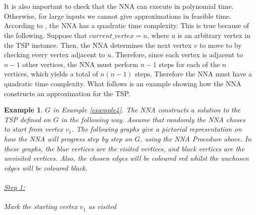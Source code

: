 \documentclass{article}
\newtheorem{example}[definition]{Example}
\begin{document}
\\\\It is also important to check that the NNA can execute in polynomial time. Otherwise, for large inputs we cannot give approximations in feasible time. According to \cite{article}, the NNA has a quadratic time complexity. This is true because of the following. Suppose that $current\_vertex = u$, where $u$ is an arbitrary vertex in the TSP instance. Then, the NNA determines the next vertex $v$ to move to by checking every vertex adjacent to $u$. Therefore, since each vertex is adjacent to $n-1$ other vertices, the NNA must perform $n-1$ steps for each of the $n$ vertices, which yields a total of $n(n-1)$ steps. Therefore the NNA must have a quadratic time complexity. What follows is an example showing how the NNA constructs an approximation for the TSP.
\begin{example}
\label{example_nna_explanation}
 $G$ in Example \ref{example4}. The NNA constructs a solution to the TSP defined on $G$ in the following way. Assume that randomly the NNA choses to start from vertex $v_1$. The following graphs give a pictorial representation on how the NNA will progress step by step on $G$, using the NNA Procedure above. In these graphs, the blue vertices are the visited vertices, and black vertices are the unvisited vertices. Also, the chosen edges will be coloured red whilst the unchosen edges will be coloured black.\\\\
\underline{Step 1:}\\\\
Mark the starting vertex $v_1$ as visited\\\\
\end{example}
\end{document}
